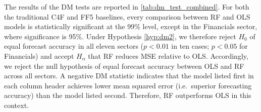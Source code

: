 The results of the DM tests are reported in \cref{tab:dm_test_combined}.  
For both the traditional C4F and FF5 baselines, every comparison between RF and OLS models is statistically significant at the 99\% level, except in the Financials sector, where significance is 95\%. Under Hypothesis \ref{hyp:dm2}, we therefore reject $H_{0}$ of equal forecast accuracy in all eleven sectors ($p<0.01$ in ten cases; $p<0.05$ for Financials) and accept $H_{\alpha}$ that RF reduces MSE relative to OLS.  Accordingly, we reject the null hypothesis of equal forecast accuracy between OLS and RF across all sectors.  A negative DM statistic indicates that the model listed first in each column header achieves lower mean squared error (i.e.\ superior forecasting accuracy) than the model listed second. Therefore, RF outperforms OLS in this context.


